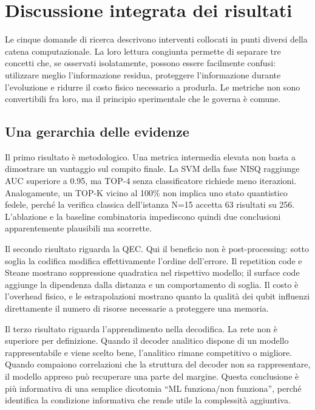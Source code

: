 \clearpage

\section{Discussione integrata dei risultati}\label{sec:finale_5_6}

Le cinque domande di ricerca descrivono interventi collocati in punti diversi della catena computazionale. La loro lettura congiunta permette di separare tre concetti che, se osservati isolatamente, possono essere facilmente confusi: utilizzare meglio l'informazione residua, proteggere l'informazione durante l'evoluzione e ridurre il costo fisico necessario a produrla. Le metriche non sono convertibili fra loro, ma il principio sperimentale che le governa è comune.

\subsection{Una gerarchia delle evidenze}\label{sec:finale_5_6_1}

Il primo risultato è metodologico. Una metrica intermedia elevata non basta a dimostrare un vantaggio sul compito finale. La SVM della fase NISQ raggiunge AUC superiore a 0.95, ma TOP-4 senza classificatore richiede meno iterazioni. Analogamente, un TOP-K vicino al 100\% non implica uno stato quantistico fedele, perché la verifica classica dell'istanza N=15 accetta 63 risultati su 256. L'ablazione e la baseline combinatoria impediscono quindi due conclusioni apparentemente plausibili ma scorrette.

Il secondo risultato riguarda la QEC. Qui il beneficio non è post-processing: sotto soglia la codifica modifica effettivamente l'ordine dell'errore. Il repetition code e Steane mostrano soppressione quadratica nel rispettivo modello; il surface code aggiunge la dipendenza dalla distanza e un comportamento di soglia. Il costo è l'overhead fisico, e le estrapolazioni mostrano quanto la qualità dei qubit influenzi direttamente il numero di risorse necessarie a proteggere una memoria.

Il terzo risultato riguarda l'apprendimento nella decodifica. La rete non è superiore per definizione. Quando il decoder analitico dispone di un modello rappresentabile e viene scelto bene, l'analitico rimane competitivo o migliore. Quando compaiono correlazioni che la struttura del decoder non sa rappresentare, il modello appreso può recuperare una parte del margine. Questa conclusione è più informativa di una semplice dicotomia ``ML funziona/non funziona'', perché identifica la condizione informativa che rende utile la complessità aggiuntiva.

